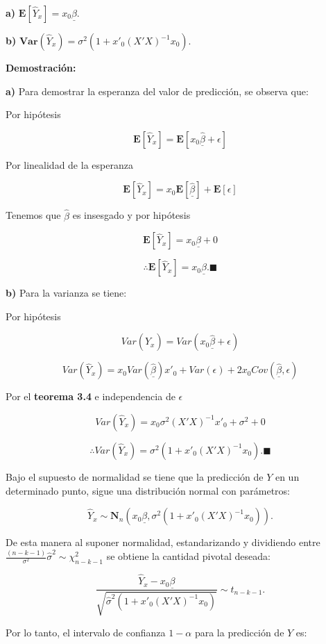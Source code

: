 \documentclass[
  a4paper,
  oneside,
  openany]{book}
\begin{document}
\textbf{a)} \(\mathbf{E}[\hat{Y}_{x}]=x_{0}\underline{\beta}.\)

\textbf{b)} \(\textbf{Var}(\hat{Y}_{x})=\sigma^2\left(1+x'_{0}(X'X)^{-1}x_{0}\right).\)

\textbf{Demostración:}

\textbf{a)} Para demostrar la esperanza del valor de predicción, se observa que:

Por hipótesis

\[\mathbf{E}[\hat{Y}_{x}]=\mathbf{E}[x_{0}\underline{\hat{\beta}}+\epsilon]\]

Por linealidad de la esperanza

\[\mathbf{E}[\hat{Y}_{x}]=x_{0}\mathbf{E}[\underline{\hat{\beta}}]+\mathbf{E}[\epsilon]\]

Tenemos que \(\hat{\beta}\) es insesgado y por hipótesis

\[\mathbf{E}[\hat{Y}_{x}]=x_{0}\underline{\beta}+0\]

\[\therefore \mathbf{E}[\hat{Y}_{x}]=x_{0}\underline{\beta}. \blacksquare\]

\textbf{b)} Para la varianza se tiene:

Por hipótesis

\[Var(\hat{Y}_{x})=Var(x_{0}\underline{\hat{\beta}}+\epsilon)\]

\[Var(\hat{Y}_{x})=x_{0}Var(\underline{\hat{\beta}})x'_{0}+Var(\epsilon)+2x_{0}Cov(\underline{\hat{\beta}},\epsilon)\]

Por el \textbf{teorema 3.4} e independencia de \(\epsilon\)

\[Var(\hat{Y}_{x})=x_{0}\sigma^2(X'X)^{-1}x'_{0}+\sigma^2+0\]

\[\therefore Var(\hat{Y}_{x})=\sigma^2\left(1+x'_{0}(X'X)^{-1}x_{0}\right). \blacksquare\]

Bajo el supuesto de normalidad se tiene que la predicción de \(Y\) en un determinado punto, sigue una distribución normal con parámetros:

\[\hat{Y}_{x} \sim \mathbf{N}_{n} \left( x_{0}\underline{\beta}, \sigma^2\left(1+x'_{0}(X'X)^{-1}x_{0}\right)\right).\]

De esta manera al suponer normalidad, estandarizando y dividiendo entre \(\frac{(n-k-1)}{\sigma^2}\hat{\sigma}^2 \sim \chi^2_{n-k-1}\) se obtiene la cantidad pivotal deseada:

\[\frac{\hat{Y}_{x}-x_{0}\underline{\beta}}{\sqrt{\hat{\sigma}^2\left(1+x'_{0}(X'X)^{-1}x_{0}\right)}} \sim t_{n-k-1}.\]

Por lo tanto, el intervalo de confianza \(1-\alpha\) para la predicción de \(Y\) es:
\end{document}
